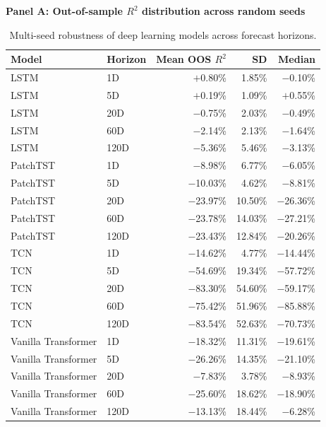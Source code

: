 \documentclass[runningheads,orivec]{llncs}
\begin{document}
\begin{table}[htbp]
\centering
\caption{Multi-seed robustness of deep learning models across forecast horizons.}\label{tab:dl_multiseed_robustness}
\renewcommand{\arraystretch}{0.96}
\setlength{\tabcolsep}{4.5pt}
\textbf{Panel A: Out-of-sample $R^2$ distribution across random seeds}\\[3pt]
\begin{tabular}{llrrr}
\hline
Model & Horizon & Mean OOS $R^2$ & SD & Median \\
\hline
LSTM & 1D   & $+$0.80\% & 1.85\% & $-$0.10\% \\
LSTM & 5D   & $+$0.19\% & 1.09\% & $+$0.55\% \\
LSTM & 20D  & $-$0.75\% & 2.03\% & $-$0.49\% \\
LSTM & 60D  & $-$2.14\% & 2.13\% & $-$1.64\% \\
LSTM & 120D & $-$5.36\% & 5.46\% & $-$3.13\% \\
\hline
PatchTST & 1D   & $-$8.98\% & 6.77\% & $-$6.05\% \\
PatchTST & 5D   & $-$10.03\% & 4.62\% & $-$8.81\% \\
PatchTST & 20D  & $-$23.97\% & 10.50\% & $-$26.36\% \\
PatchTST & 60D  & $-$23.78\% & 14.03\% & $-$27.21\% \\
PatchTST & 120D & $-$23.43\% & 12.84\% & $-$20.26\% \\
\hline
TCN & 1D   & $-$14.62\% & 4.77\% & $-$14.44\% \\
TCN & 5D   & $-$54.69\% & 19.34\% & $-$57.72\% \\
TCN & 20D  & $-$83.30\% & 54.60\% & $-$59.17\% \\
TCN & 60D  & $-$75.42\% & 51.96\% & $-$85.88\% \\
TCN & 120D & $-$83.54\% & 52.63\% & $-$70.73\% \\
\hline
Vanilla Transformer & 1D   & $-$18.32\% & 11.31\% & $-$19.61\% \\
Vanilla Transformer & 5D   & $-$26.26\% & 14.35\% & $-$21.10\% \\
Vanilla Transformer & 20D  & $-$7.83\% & 3.78\% & $-$8.93\% \\
Vanilla Transformer & 60D  & $-$25.60\% & 18.62\% & $-$18.90\% \\
Vanilla Transformer & 120D & $-$13.13\% & 18.44\% & $-$6.28\% \\
\hline
\end{tabular}


\end{table}
\end{document}
